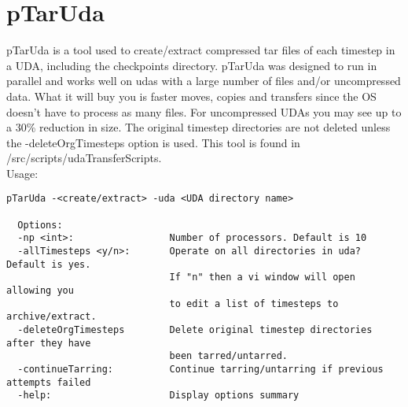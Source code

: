 \section{pTarUda}
pTarUda is a tool used to create/extract compressed tar files of each timestep in a UDA, including the checkpoints directory. pTarUda was designed to run in parallel and works well on udas with a large number of files and/or uncompressed data.  What it will buy you is faster moves, copies and transfers since the OS doesn't have to process as many files.  For uncompressed UDAs you may see up to a 30\% reduction in size. The original timestep directories are not deleted unless the -deleteOrgTimesteps option is used. This tool is found in /src/scripts/udaTransferScripts.
\\
Usage:
\begin{Verbatim}[fontsize=\footnotesize]
pTarUda -<create/extract> -uda <UDA directory name>

  Options:
  -np <int>:                 Number of processors. Default is 10                           
  -allTimesteps <y/n>:       Operate on all directories in uda? Default is yes.            
                             If "n" then a vi window will open allowing you                
                             to edit a list of timesteps to archive/extract.               
  -deleteOrgTimesteps        Delete original timestep directories after they have          
                             been tarred/untarred.                                         
  -continueTarring:          Continue tarring/untarring if previous attempts failed        
  -help:                     Display options summary                                       
\end{Verbatim}
\normalsize


